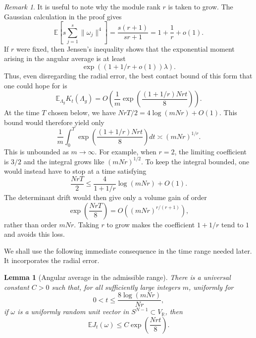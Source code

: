 \documentclass[11pt]{article}
\newtheorem{lemma}[theorem]{Lemma}
\theoremstyle{remark}
\newtheorem{remark}[theorem]{Remark}
\newcommand{\R}{\mathbb R}
\newcommand{\E}{\mathbb E}
\begin{document}
\begin{remark}
\label{re:effect_of_rank}
It is useful to note why the module rank $r$ is taken to grow.  The Gaussian
calculation in the proof gives
\[
        \E\left[s\sum_{j=1}^s\|\omega_j\|^4\right]
        =\frac{s(r+1)}{sr+1}=1+\frac1r+o(1).
\]
If $r$ were fixed, then Jensen's inequality shows that the exponential moment
arising in the angular average is at least
\[
        \exp\left((1+1/r+o(1))\lambda\right).
\]
Thus, even disregarding the radial error, the best contact bound of this form
that one could hope for is
\[
        \E_{\Lambda_g}K_t(\Lambda_g)
        =O\left(\frac1m
        \exp\left(\frac{(1+1/r)Nrt}{8}\right)\right).
\]
At the time $T$ chosen below, we have
$NrT/2=4\log(mNr)+O(1)$.  This bound would therefore yield only
\[
        \frac1m\int_0^T
        \exp\left(\frac{(1+1/r)Nrt}{8}\right)dt
        \asymp(mNr)^{1/r}.
\]
This is unbounded as $m\to\infty$.
For example, when $r=2$, the limiting coefficient is $3/2$ and the integral
grows like $(mNr)^{1/2}$.  To keep the integral bounded, one would instead have
to stop at a time satisfying
\[
        \frac{NrT}{2}\le\frac{4}{1+1/r}\log(mNr)+O(1).
\]
The determinant drift would then give only a volume gain of order
\[
        \exp\left(\frac{NrT}{8}\right)=O\left((mNr)^{r/(r+1)}\right),
\]
rather than order $mNr$.  Taking $r$ to grow makes the coefficient $1+1/r$
tend to $1$ and avoids this loss.
\end{remark}

We shall use the following immediate consequence in the time range needed
later.  It incorporates the radial error.


\begin{lemma}[Angular average in the admissible range]\label{lem:angular-radial}
There is a universal constant $C>0$ such that, for all sufficiently large
integers $m$, uniformly for
\[
        0<t\le\frac{8\log(mNr)}{Nr},
\]
if $\omega$ is a uniformly random unit vector in $S^{N-1}\subset V_\R$, then
\[
        \E J_t(\omega)
        \le C\exp\left(\frac{Nrt}{8}\right).
\]
\end{lemma}
\end{document}
